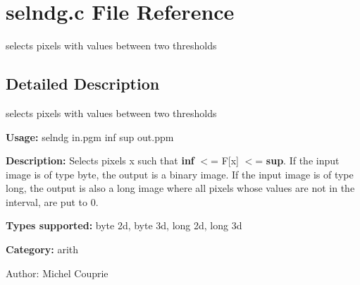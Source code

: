\section{selndg.c File Reference}
\label{selndg_8c}
selects pixels with values between two thresholds 



\subsection{Detailed Description}
selects pixels with values between two thresholds 

{\bf Usage:} selndg in.pgm inf sup out.ppm

{\bf Description:} Selects pixels x such that {\bf inf} $<$= F[x] $<$= {\bf sup}. If the input image is of type byte, the output is a binary image. If the input image is of type long, the output is also a long image where all pixels whose values are not in the interval, are put to 0.

{\bf Types supported:} byte 2d, byte 3d, long 2d, long 3d

{\bf Category:} arith

\begin{Desc}
\item[Author:]Michel Couprie \end{Desc}
